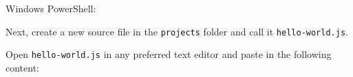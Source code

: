Windows PowerShell:

\begin{Shaded}
\begin{Highlighting}[]
\OperatorTok{:}
 \OperatorTok{:}
\end{Highlighting}
\end{Shaded}

Next, create a new source file in the \texttt{projects} folder and call
it \texttt{hello-world.js}.

Open \texttt{hello-world.js} in any preferred text editor and paste in
the following content:

\begin{Shaded}
\begin{Highlighting}[]
\OperatorTok{=} \NormalTok{(}\NormalTok{)}\OperatorTok{;}

\OperatorTok{=} \OperatorTok{;}
\OperatorTok{=} \OperatorTok{;}

\OperatorTok{=}\OperatorTok{,}\KeywordTok{=\textgreater{}}\NormalTok{ \{}
 \OperatorTok{=} \OperatorTok{;}
\NormalTok{(}\OperatorTok{,} \NormalTok{)}\OperatorTok{;}
\NormalTok{(}\StringTok{\textquotesingle{}}\NormalTok{)}\OperatorTok{;}
\NormalTok{\})}\OperatorTok{;}

\OperatorTok{,}\OperatorTok{,}\NormalTok{ () }\KeywordTok{=\textgreater{}}\NormalTok{ \{}
  \NormalTok{(}\SpecialCharTok{$\{}\SpecialCharTok{\}}\VerbatimStringTok{:}\SpecialCharTok{$\{}\SpecialCharTok{\}}\VerbatimStringTok{/\textasciigrave{}}\NormalTok{)}\OperatorTok{;}
\NormalTok{\})}\OperatorTok{;}
\end{Highlighting}
\end{Shaded}

